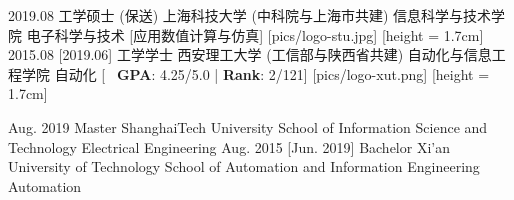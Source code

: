 \ifzh
{}
\begin{educations}[logo]
    \education
    {2019.08}
    {工学硕士 (保送)}
    {上海科技大学 (中科院与上海市共建)}
    {信息科学与技术学院}
    {电子科学与技术}
    [\textbullet 应用数值计算与仿真] %
    [pics/logo-stu.jpg]
    [height = 1.7cm]
    \separator{0.5ex}
    \education
    {2015.08}
    [2019.06]
    {工学学士}
    {西安理工大学 (工信部与陕西省共建)}
    {自动化与信息工程学院}
    {自动化}
    [\textbullet ~ \textbf{GPA}: 4.25/5.0 | \textbf{Rank}: 2/121]
    [pics/logo-xut.png]
    [height = 1.7cm]
\end{educations}
\else
{}
\begin{educations}
    \education
    {Aug. 2019}
    {Master}
    {ShanghaiTech University}
    {School of Information Science and Technology}
    {Electrical Engineering}
    \separator{0.5ex}
    \education
    {Aug. 2015}
    [Jun. 2019]
    {Bachelor}
    {Xi'an University of Technology}
    {School of Automation and Information Engineering}
    {Automation}
\end{educations}
\fi